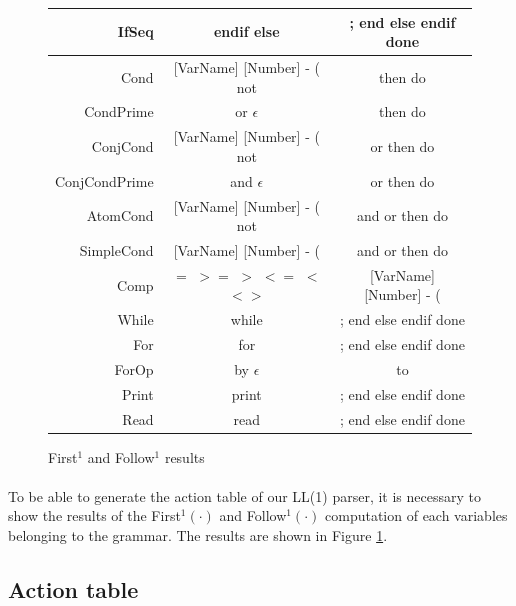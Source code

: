 \documentclass[letterpaper]{article}
\begin{document}
{\begin{figure}[H]
\begin{tabular}{| r || c | c |}
        \hline
        IfSeq & endif else & ; end else endif done \\
        \hline
        Cond & [VarName] [Number] - ( not & then do \\
        \hline
        CondPrime & or $\epsilon$ & then do \\
        \hline
        ConjCond & [VarName] [Number] - ( not &
        or then do  \\
        \hline
        ConjCondPrime & and $\epsilon$ & or then do\\
        \hline
        AtomCond & [VarName] [Number] - ( not &
        and or then do \\
        \hline
        SimpleCond & [VarName] [Number] - ( &
        and or then do \\
        \hline
        Comp & $=$ $>=$ $>$ $<=$ $<$ $<>$ &
        [VarName] [Number] - ( \\
        \hline
        While & while & ; end else endif done \\
        \hline
        For & for & ; end else endif done \\
        \hline
        ForOp & by $\epsilon$ & to \\
        \hline
        Print & print & ; end else endif done \\
        \hline
        Read & read & ; end else endif done \\
        \hline
    \end{tabular}
    \caption{First$^1$ and Follow$^1$ results}
    \label{fig:firstfollow}
\end{figure}
\clearpage
\restoregeometry
}

\paragraph{}

To be able to generate the action table of our LL(1) parser, it is necessary
to show the results of the First$^1(\cdot)$ and Follow$^1(\cdot)$
computation of each variables
belonging to the grammar. The results are shown in Figure \ref{fig:firstfollow}.

\subsection{Action table}

\paragraph{}
\end{document}

